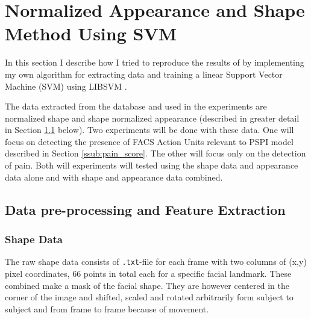 \documentclass[Main]{subfiles}
\begin{document}
\section{Normalized Appearance and Shape Method Using SVM} %
	\label{sec:normalized_appearance_and_shape_method_using_svm}
	In this section I describe how I tried to reproduce the results of \cite{Lucey2011} by implementing my own algorithm for extracting data and training a linear Support Vector Machine (SVM) using LIBSVM \cite{CC01a}.

	The data extracted from the database and used in the experiments are normalized shape and shape normalized appearance (described in greater detail in Section \ref{sub:data_pre_processing_and_feature_extraction} below).
	Two experiments will be done with these data.
	One will focus on detecting the presence of FACS Action Units relevant to PSPI model described in Section \ref{ssub:pain_score}.
	The other will focus only on the detection of pain.
	Both will experiments will tested using the shape data and appearance data alone and with shape and appearance data combined.



		

	\subsection{Data pre-processing and Feature Extraction} %
		\label{sub:data_pre_processing_and_feature_extraction}

		\subsubsection{Shape Data} %
			\label{ssub:shape_data}
			The raw shape data consists of \texttt{.txt}-file for each frame with two columns of (x,y) pixel coordinates, 66 points in total each for a specific facial landmark.
			These combined make a mask of the facial shape.
			They are however centered in the corner of the image and shifted, scaled and rotated arbitrarily form subject to subject and from frame to frame because of movement.
\end{document}
